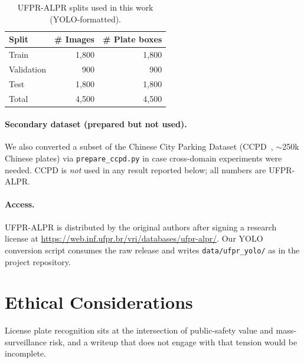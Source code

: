 \documentclass[11pt]{article}
\begin{document}
\begin{table}[H]
\centering
\caption{UFPR-ALPR splits used in this work (YOLO-formatted).}
\label{tab:splits}
\begin{tabular}{lrr}
\toprule
Split & \# Images & \# Plate boxes \\
\midrule
Train      & 1{,}800 & 1{,}800 \\
Validation &   900   &   900   \\
Test       & 1{,}800 & 1{,}800 \\
\midrule
Total      & 4{,}500 & 4{,}500 \\
\bottomrule
\end{tabular}
\end{table}

\paragraph{Secondary dataset (prepared but not used).}
We also converted a subset of the Chinese City Parking Dataset
(CCPD~\cite{ccpd}, $\sim$250k Chinese plates) via \texttt{prepare\_ccpd.py}
in case cross-domain experiments were needed. CCPD is \emph{not} used in any
result reported below; all numbers are UFPR-ALPR.

\paragraph{Access.}
UFPR-ALPR is distributed by the original authors after signing a research
license at
\url{https://web.inf.ufpr.br/vri/databases/ufpr-alpr/}. Our YOLO conversion
script consumes the raw release and writes \texttt{data/ufpr\_yolo/} as in
the project repository.

\section{Ethical Considerations}

License plate recognition sits at the intersection of public-safety value and
mass-surveillance risk, and a writeup that does not engage with that tension
would be incomplete.
\end{document}
